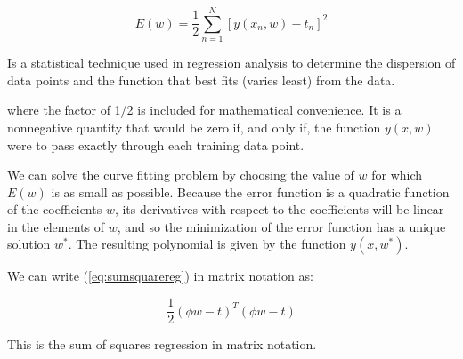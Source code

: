 \begin{Equation}[H]
	\centering
	\begin{equation}\label{eq:sumsquarereg}
		E(w)=\frac{1}{2} \sum_{n=1}^{N} [y(x_n,w)-t_n]^2
	\end{equation}
	\caption[Sum of squares regression.]{Is a statistical technique used in regression analysis to determine the dispersion of data points and the function that best fits (varies least) from the data.}
\end{Equation}

\noindent where the factor of 1/2 is included for mathematical convenience. It is a nonnegative quantity that would be zero if, and only if, the function $y(x, w)$ were to pass exactly through each training data point.

\noindent We can solve the curve fitting problem by choosing the value of $w$ for which $E(w)$ is as small as possible. Because the error function is a quadratic function of the coefficients $w$, its derivatives with respect to the coefficients will be linear in the elements of $w$, and so the minimization of the error function has a unique solution $w^*$. The resulting polynomial is given by the function $y(x, w^*)$.




\noindent We can write (\ref{eq:sumsquarereg}) in matrix notation as:

\begin{Equation}[H]
	\centering
	\begin{equation}\label{eq:sumsquareregvec}
	\frac{1}{2} (\phi w - t)^T (\phi w - t)
	\end{equation}
	\caption[Sum of squares regression in matrix notation.]{This is the sum of squares regression in matrix notation.}
\end{Equation}

